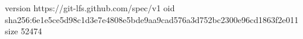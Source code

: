 version https://git-lfs.github.com/spec/v1
oid sha256:6e1e5ce5d98c1d3e7e4808e5bde9aa9cad576a3d752bc2300e96cd1863f2e011
size 52474
